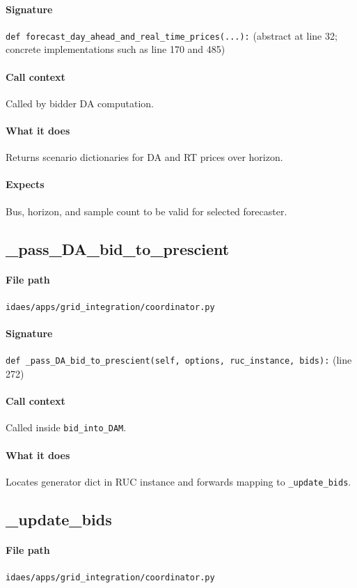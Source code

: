 \documentclass{article}
\begin{document}
\paragraph{Signature} \texttt{def forecast\_day\_ahead\_and\_real\_time\_prices(...):} (abstract at line 32; concrete implementations such as line 170 and 485)
\paragraph{Call context} Called by bidder DA computation.
\paragraph{What it does} Returns scenario dictionaries for DA and RT prices over horizon.
\paragraph{Expects} Bus, horizon, and sample count to be valid for selected forecaster.

\subsection{\_pass\_DA\_bid\_to\_prescient}\label{fn:pass_DA_bid_to_prescient}
\paragraph{File path} \texttt{idaes/apps/grid\_integration/coordinator.py}
\paragraph{Signature} \texttt{def \_pass\_DA\_bid\_to\_prescient(self, options, ruc\_instance, bids):} (line 272)
\paragraph{Call context} Called inside \texttt{bid\_into\_DAM}.
\paragraph{What it does} Locates generator dict in RUC instance and forwards mapping to \texttt{\_update\_bids}.

\subsection{\_update\_bids}\label{fn:update_bids}
\paragraph{File path} \texttt{idaes/apps/grid\_integration/coordinator.py}
\end{document}
